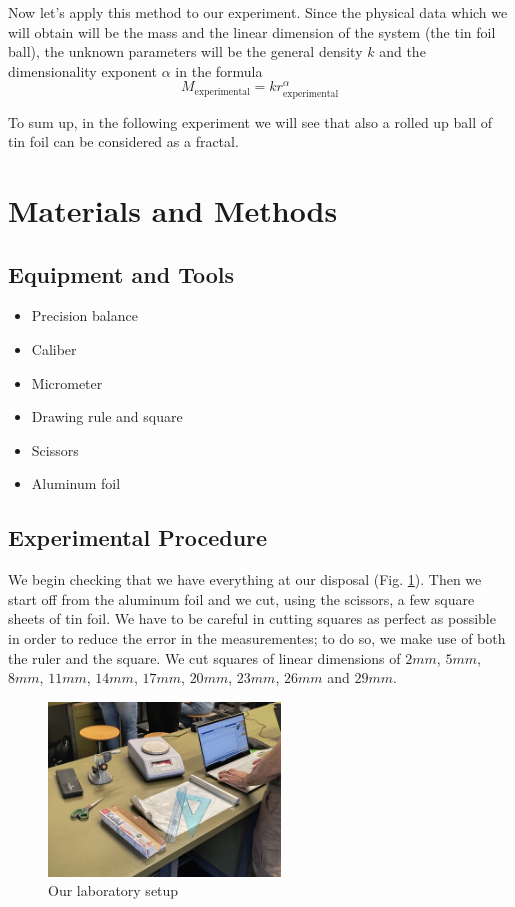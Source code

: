 \documentclass[a4paper,12pt]{article}
\begin{document}
\par Now let's apply this method to our experiment. Since the physical data which we 
will obtain will be the mass and the linear dimension of the system 
(the tin foil ball), the unknown parameters will be the general density $k$ and 
the dimensionality exponent $\alpha$ in the formula
\begin{equation} 
    M_{\text{experimental}} = k r_{\text{experimental}}^{\alpha}
    \label{eq:gen_fractal}
\end{equation}   

To sum up, in the following experiment we will see that also a rolled up ball of 
tin foil can be considered as a fractal.


\section{Materials and Methods}
\subsection{Equipment and Tools}
\begin{itemize}
    \item Precision balance
    \item Caliber
    \item Micrometer
    \item Drawing rule and square
    \item Scissors
    \item Aluminum foil
\end{itemize}

\subsection{Experimental Procedure}
We begin checking that we have everything at our disposal (Fig. \ref{fig:lab_instr}).
Then we start off from the aluminum foil and we cut, using the scissors, a few square sheets of tin foil. 
We have to be careful in cutting squares as perfect as possible in order to reduce the error in 
the measurementes; to do so, we make use of both the ruler and the square. We cut squares of linear 
dimensions of $2 mm$, $5 mm$, $8 mm$, $11 mm$, $14 mm$, $17 mm$, $20 mm$, $23 mm$, $26 mm$ and $29 mm$.

\begin{figure}[h]
    \centering
    \includegraphics[width = 0.55\textwidth]{Lab_instruments.jpg}
    \caption{Our laboratory setup}
    \label{fig:lab_instr}
\end{figure}
\end{document}

